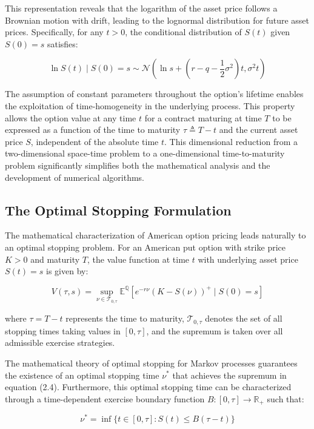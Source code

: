 \documentclass[
  american,
  11pt,
  11pt,
  letterpaper,
  onecolumn]{article}
\begin{document}
This representation reveals that the logarithm of the asset price
follows a Brownian motion with drift, leading to the lognormal
distribution for future asset prices. Specifically, for any \(t > 0\),
the conditional distribution of \(S(t)\) given \(S(0) = s\) satisfies:

\[\ln S(t) \mid S(0) = s \sim \mathcal{N}\left(\ln s + \left(r-q-\frac{1}{2}\sigma^2\right)t, \sigma^2 t\right) \tag{2.3}\]

The assumption of constant parameters throughout the option's lifetime
enables the exploitation of time-homogeneity in the underlying process.
This property allows the option value at any time \(t\) for a contract
maturing at time \(T\) to be expressed as a function of the time to
maturity \(\tau \triangleq T-t\) and the current asset price \(S\),
independent of the absolute time \(t\). This dimensional reduction from
a two-dimensional space-time problem to a one-dimensional
time-to-maturity problem significantly simplifies both the mathematical
analysis and the development of numerical algorithms.

\subsection{The Optimal Stopping
Formulation}\label{the-optimal-stopping-formulation}

The mathematical characterization of American option pricing leads
naturally to an optimal stopping problem. For an American put option
with strike price \(K > 0\) and maturity \(T\), the value function at
time \(t\) with underlying asset price \(S(t) = s\) is given by:

\[V(\tau,s) = \sup_{\nu \in \mathcal{T}_{0,\tau}} \mathbb{E}^{\mathbb{Q}}\left[e^{-r\nu}(K-S(\nu))^+ \mid S(0) = s\right] \tag{2.4}\]

where \(\tau = T-t\) represents the time to maturity,
\(\mathcal{T}_{0,\tau}\) denotes the set of all stopping times taking
values in \([0,\tau]\), and the supremum is taken over all admissible
exercise strategies.

The mathematical theory of optimal stopping for Markov processes
guarantees the existence of an optimal stopping time \(\nu^*\) that
achieves the supremum in equation (2.4). Furthermore, this optimal
stopping time can be characterized through a time-dependent exercise
boundary function \(B: [0,\tau] \to \mathbb{R}_+\) such that:

\[\nu^* = \inf\{t \in [0,\tau] : S(t) \leq B(\tau-t)\} \tag{2.5}\]
\end{document}
